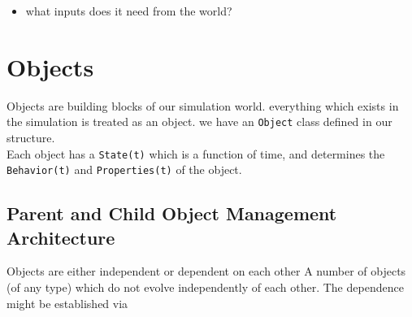 \documentclass[a4paper]{report}
\begin{document}
\begin{itemize}
\item what inputs does it need from the world?
\end{itemize}

\chapter{Objects}
Objects are building blocks of our simulation world. everything which exists in the simulation is treated as an object. we have an \verb+Object+ class defined in our structure. \\
Each object has a \verb+State(t)+ which is a function of time, and determines the \verb+Behavior(t)+ and \verb+Properties(t)+ of the object. \\

\section{Parent and Child Object Management Architecture}
Objects are either independent or dependent on each other
A number of objects (of any type) which do not evolve independently of each other. The dependence might be established via 
\end{document}
